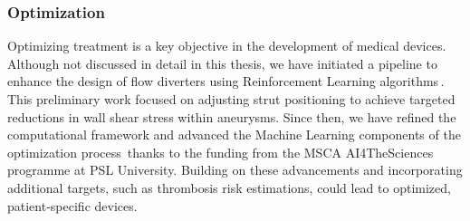 \subsubsection*{Optimization}
Optimizing treatment is a key objective in the development of medical devices. Although not discussed in detail in this thesis, we have initiated a pipeline to enhance the design of flow diverters using Reinforcement Learning algorithms\,\cite{Hachem2023}. This preliminary work focused on adjusting strut positioning to achieve targeted reductions in wall shear stress within aneurysms. Since then, we have refined the computational framework and advanced the Machine Learning components of the optimization process\,\cite{Viquerat2024} thanks to the funding from the MSCA AI4TheSciences programme at PSL University. Building on these advancements and incorporating additional targets, such as thrombosis risk estimations, could lead to optimized, patient-specific devices.

\newpage

{\footnotesize}
